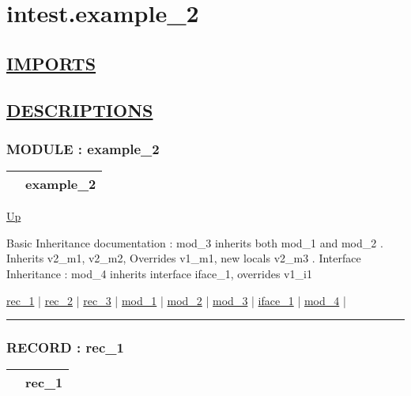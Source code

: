 \chapter*{intest.example\_2}
\hypertarget{ecldoc:toc:intest.example_2}{}

\section*{\underline{IMPORTS}}

\section*{\underline{DESCRIPTIONS}}
\subsection*{MODULE : example\_2}
\hypertarget{ecldoc:intest.example_2}{}

{\renewcommand{\arraystretch}{1.5}
\begin{tabularx}{\textwidth}{|>{\raggedright\arraybackslash}l|X|}
\hline
\hspace{0pt} & example\_2 \\
\hline
\end{tabularx}
}

\hyperlink{ecldoc:toc:intest}{Up}

\par
Basic Inheritance documentation : mod\_3 inherits both mod\_1 and mod\_2 . Inherits v2\_m1, v2\_m2, Overrides v1\_m1, new locals v2\_m3 . Interface Inheritance : mod\_4 inherits interface iface\_1, overrides v1\_i1


\hyperlink{ecldoc:intest.example_2.rec_1}{rec\_1}  |
\hyperlink{ecldoc:intest.example_2.rec_2}{rec\_2}  |
\hyperlink{ecldoc:intest.example_2.rec_3}{rec\_3}  |
\hyperlink{ecldoc:intest.example_2.mod_1}{mod\_1}  |
\hyperlink{ecldoc:intest.example_2.mod_2}{mod\_2}  |
\hyperlink{ecldoc:intest.example_2.mod_3}{mod\_3}  |
\hyperlink{ecldoc:intest.example_2.iface_1}{iface\_1}  |
\hyperlink{ecldoc:intest.example_2.mod_4}{mod\_4}  |

\rule{\textwidth}{0.4pt}

\subsection*{RECORD : rec\_1}
\hypertarget{ecldoc:intest.example_2.rec_1}{}

{\renewcommand{\arraystretch}{1.5}
\begin{tabularx}{\textwidth}{|>{\raggedright\arraybackslash}l|X|}
\hline
\hspace{0pt} & rec\_1 \\
\hline
\end{tabularx}
}


